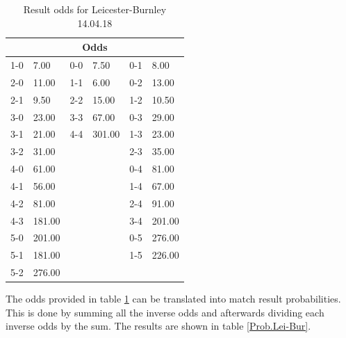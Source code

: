 \begin{table}[H]
\centering
\caption{Result odds for Leicester-Burnley 14.04.18}
\label{Leicester-Burnley}
\begin{tabular}{|ll|ll|ll|}
\multicolumn{6}{c}{Odds}                   \\
\hline
1-0 & 7.00   & 0-0 & 7.50   & 0-1 & 8.00   \\
2-0 & 11.00  & 1-1 & 6.00   & 0-2 & 13.00  \\
2-1 & 9.50   & 2-2 & 15.00  & 1-2 & 10.50  \\
3-0 & 23.00  & 3-3 & 67.00  & 0-3 & 29.00  \\
3-1 & 21.00  & 4-4 & 301.00 & 1-3 & 23.00  \\
3-2 & 31.00  &     &        & 2-3 & 35.00  \\
4-0 & 61.00  &     &        & 0-4 & 81.00  \\
4-1 & 56.00  &     &        & 1-4 & 67.00  \\
4-2 & 81.00  &     &        & 2-4 & 91.00  \\
4-3 & 181.00 &     &        & 3-4 & 201.00 \\
5-0 & 201.00 &     &        & 0-5 & 276.00 \\
5-1 & 181.00 &     &        & 1-5 & 226.00 \\
5-2 & 276.00 &     &        &     &        \\
\hline
\end{tabular}
\end{table}

The odds provided in table \ref{Leicester-Burnley} can be translated into match result probabilities. This is done by summing all the inverse odds and afterwards dividing each inverse odds by the sum. The results are shown in table \ref{Prob.Lei-Bur}.


